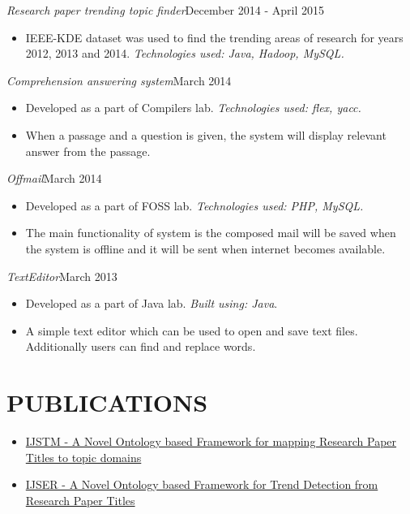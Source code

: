 \documentclass[11pt,a4paper]{article}
\begin{document}
\emph{Research paper trending topic finder}{\hfill December 2014 - April 2015}
\begin{itemize}[noitemsep]
\item  IEEE-KDE dataset was used to find the trending areas of research for years 2012, 2013 and 2014. \emph{Technologies
used: Java, Hadoop, MySQL.}
\end{itemize}
\emph{Comprehension answering system}{\hfill March 2014}
\begin{itemize}[noitemsep]
\item Developed as a part of Compilers lab. \emph{Technologies used: flex, yacc.}
\item When a passage and a question is given, the system will display relevant answer from the passage.
\end{itemize}
\emph{Offmail}{\hfill March 2014}
\begin{itemize}[noitemsep]
\item Developed as a part of FOSS lab. \emph{Technologies used: PHP, MySQL.}
\item The main functionality of system is the composed mail will be saved when the system is offline and it will be sent when internet
becomes available.
\end{itemize}
\emph{TextEditor}{\hfill March 2013}
\begin{itemize}[noitemsep]
\item Developed as a part of Java lab. \emph{Built using: Java}.
\item A simple text editor which can be used to open and save text files. Additionally users can find and replace
words.
\end{itemize}
\section* {PUBLICATIONS}
\begin{itemize}[noitemsep]
\item \href{http://www.ijstm.com/images/short_pdf/1427308779_1228.pdf}{IJSTM - A Novel Ontology based Framework for mapping Research Paper Titles to topic domains}
\item \href{https://www.ijser.org/researchpaper/A-Novel-Ontology-based-Framework-for-Trend-Detection-from-Research-Paper-Titles.pdf}{IJSER - A Novel Ontology based Framework for Trend Detection from Research Paper Titles}
\end{itemize}
\end{document}

